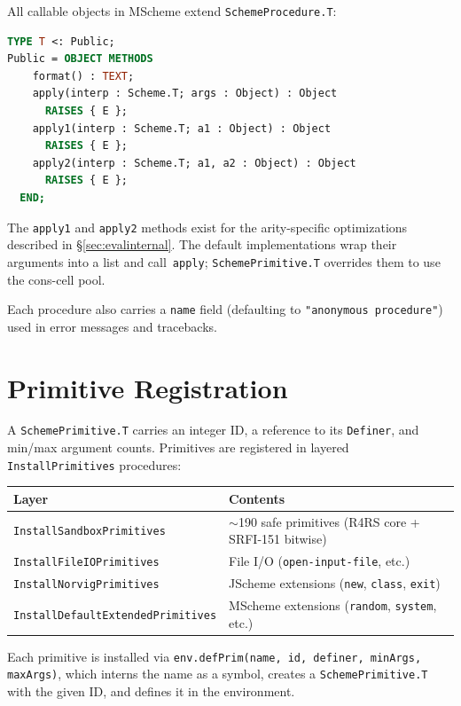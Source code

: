 \documentclass[12pt]{report}
\begin{document}
All callable objects in MScheme extend \texttt{SchemeProcedure.T}:

\begin{lstlisting}[language=Modula3]
TYPE T <: Public;
Public = OBJECT METHODS
    format() : TEXT;
    apply(interp : Scheme.T; args : Object) : Object
      RAISES { E };
    apply1(interp : Scheme.T; a1 : Object) : Object
      RAISES { E };
    apply2(interp : Scheme.T; a1, a2 : Object) : Object
      RAISES { E };
  END;
\end{lstlisting}

The \texttt{apply1} and \texttt{apply2} methods exist for the
arity-specific optimizations described in \S\ref{sec:evalinternal}.
The default implementations wrap their arguments into a list and
call~\texttt{apply}; \texttt{SchemePrimitive.T} overrides them to
use the cons-cell pool.

Each procedure also carries a \texttt{name} field (defaulting to
\texttt{"anonymous procedure"}) used in error messages and tracebacks.

\section{Primitive Registration}

A \texttt{SchemePrimitive.T} carries an integer ID, a reference to
its \texttt{Definer}, and min/max argument counts.  Primitives are
registered in layered \texttt{InstallPrimitives} procedures:

\begin{center}
\begin{tabular}{ll}
\toprule
\textbf{Layer} & \textbf{Contents} \\
\midrule
\texttt{InstallSandboxPrimitives} & $\sim$190 safe primitives (R4RS core + SRFI-151 bitwise) \\
\texttt{InstallFileIOPrimitives} & File I/O (\texttt{open-input-file}, etc.) \\
\texttt{InstallNorvigPrimitives} & JScheme extensions (\texttt{new}, \texttt{class}, \texttt{exit}) \\
\texttt{InstallDefaultExtendedPrimitives} & MScheme extensions (\texttt{random}, \texttt{system}, etc.) \\
\bottomrule
\end{tabular}
\end{center}

Each primitive is installed via \texttt{env.defPrim(name, id, definer,
minArgs, maxArgs)}, which interns the name as a symbol, creates a
\texttt{SchemePrimitive.T} with the given ID, and defines it in the
environment.
\end{document}
